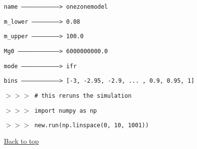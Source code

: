 \documentclass{report}
\begin{document}
\texttt{name ---------------------------------> onezonemodel} \par\noindent 
\texttt{m\_lower ------------------------> 0.08} \par\noindent 
\texttt{m\_upper ------------------------> 100.0} \par\noindent 
\texttt{Mg0 ------------------------------------> 6000000000.0} \par\noindent 
\texttt{mode ---------------------------------> ifr} \par\noindent 
\texttt{bins ---------------------------------> [-3, -2.95, -2.9, ... , 0.9, 
0.95, 1]} \par\noindent 
\texttt{$>>>$ \# this reruns the simulation} \par\noindent 
\texttt{$>>>$ import numpy as np} \par\noindent 
\texttt{$>>>$ new.run(np.linspace(0, 10, 1001))} \par\noindent 

\vfill 
\hyperlink{top}{Back to top} 
\clearpage 
\end{document}

